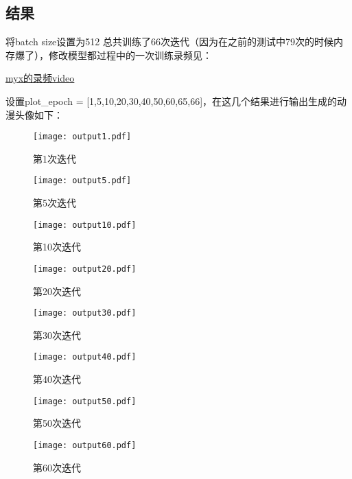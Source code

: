 \documentclass[a4paper,AutoFakeBold,AutoFakeSlant]{ctexart}
\begin{document}
\subsection{结果}
将batch size设置为512
总共训练了66次迭代（因为在之前的测试中79次的时候内存爆了），修改模型都过程中的一次训练录频见：

\href{https://rec.ustc.edu.cn/share/7259c0e0-ebe3-11ec-a564-eb71e104f879}{myx的录频video} 

设置plot\_epoch = [1,5,10,20,30,40,50,60,65,66]，在这几个结果进行输出生成的动漫头像如下：
\begin{figure}[H]
  \centering
  \begin{minipage}[t]{0.48\textwidth}
  \centering
  \texttt{[image: output1.pdf]}
  \caption{第1次迭代}
  \end{minipage}
  \begin{minipage}[t]{0.48\textwidth}
  \centering
  \texttt{[image: output5.pdf]}
  \caption{第5次迭代}
  \end{minipage}
\end{figure}

\begin{figure}[H]
  \centering
  \begin{minipage}[t]{0.48\textwidth}
  \centering
  \texttt{[image: output10.pdf]}
  \caption{第10次迭代}
  \end{minipage}
  \begin{minipage}[t]{0.48\textwidth}
  \centering
  \texttt{[image: output20.pdf]}
  \caption{第20次迭代}
  \end{minipage}
\end{figure}

\begin{figure}[H]
  \centering
  \begin{minipage}[t]{0.48\textwidth}
  \centering
  \texttt{[image: output30.pdf]}
  \caption{第30次迭代}
  \end{minipage}
  \begin{minipage}[t]{0.48\textwidth}
  \centering
  \texttt{[image: output40.pdf]}
  \caption{第40次迭代}
  \end{minipage}
\end{figure}

\begin{figure}[H]
  \centering
  \begin{minipage}[t]{0.48\textwidth}
  \centering
  \texttt{[image: output50.pdf]}
  \caption{第50次迭代}
  \end{minipage}
  \begin{minipage}[t]{0.48\textwidth}
  \centering
  \texttt{[image: output60.pdf]}
  \caption{第60次迭代}
  \end{minipage}
\end{figure}
\end{document}

